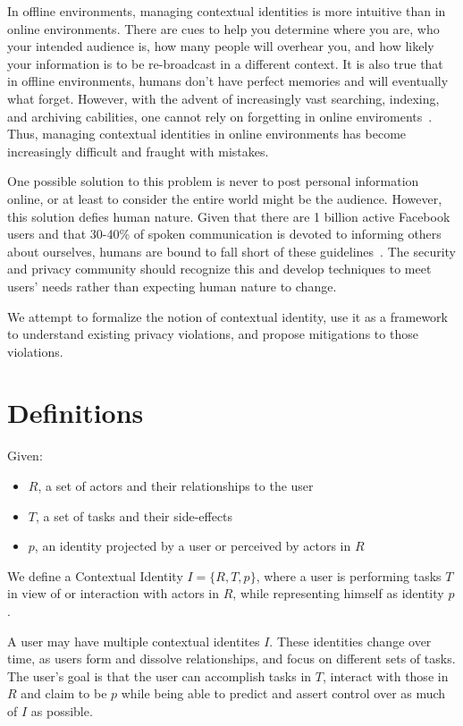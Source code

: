 \documentclass{llncs}
\begin{document}
In offline environments, managing contextual identities is more intuitive than
in online environments. There are cues to help you determine where you are,
who your intended audience is, how many people will overhear you, and how
likely your information is to be re-broadcast in a different context. It is
also true that in offline environments, humans don't have perfect memories and
will eventually what forget.  However, with the advent of increasingly vast
searching, indexing, and archiving cabilities, one cannot rely on forgetting in
online enviroments~\cite{delete}. Thus, managing contextual identities in
online environments has become increasingly difficult and fraught with
mistakes.

One possible solution to this problem is never to post personal information
online, or at least to consider the entire world might be the audience.
However, this solution defies human nature. Given that there are 1 billion
active Facebook users and that 30-40\% of spoken communication is devoted to
informing others about ourselves, humans are bound to fall short of these
guidelines~\cite{tamir,fbusers}. The security and privacy community should
recognize this and develop techniques to meet users' needs rather than
expecting human nature to change.

We attempt to formalize the notion of contextual identity, use it as a
framework to understand existing privacy violations, and propose mitigations to
those violations.

\section{Definitions}

\begin{definition}
  Given:
  \begin{itemize}
    \item $R$, a set of actors and their relationships to the user
    \item $T$, a set of tasks and their side-effects
    \item $p$, an identity projected by a user or perceived by actors in $R$
  \end{itemize}
\medskip

  We define a Contextual Identity $I = \{R,T,p\}$, where a user is performing tasks $T$ in view of or interaction with actors in $R$, while representing himself as identity $p$.
\end{definition}

A user may have multiple contextual identites $I$. These identities change over
time, as users form and dissolve relationships, and focus on different sets of
tasks. The user's goal is that the user can accomplish tasks in $T$, interact
with those in $R$ and claim to be $p$  while being able to predict and assert
control over as much of $I$ as possible.
\end{document}
